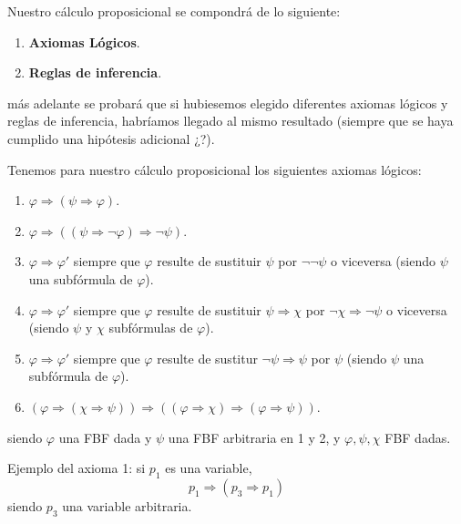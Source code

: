 \documentclass[12pt]{report}
\theoremstyle{largebreak}
\begin{document}
    Nuestro cálculo proposicional se compondrá de lo siguiente:
    \begin{enumerate}
        \item \textbf{Axiomas Lógicos}.
        \item \textbf{Reglas de inferencia}.
    \end{enumerate}
    más adelante se probará que si hubiesemos elegido diferentes axiomas lógicos y reglas de inferencia, habríamos llegado al mismo resultado (siempre que se haya cumplido una hipótesis adicional ¿?). 

    \begin{mydef}
        Tenemos para nuestro cálculo proposicional los siguientes axiomas lógicos:
        \begin{enumerate}
            \item $\varphi\Rightarrow(\psi\Rightarrow\varphi)$.
            \item $\varphi\Rightarrow((\psi\Rightarrow\neg\varphi)\Rightarrow\neg\psi)$.
            \item $\varphi\Rightarrow\varphi'$ siempre que $\varphi$ resulte de sustituir $\psi$ por $\neg\neg\psi$ o viceversa (siendo $\psi$ una subfórmula de $\varphi$).
            \item $\varphi\Rightarrow\varphi'$ siempre que $\varphi$ resulte de sustituir $\psi\Rightarrow\chi$ por $\neg\chi\Rightarrow\neg\psi$ o viceversa (siendo $\psi$ y $\chi$ subfórmulas de $\varphi$).
            \item $\varphi\Rightarrow\varphi'$ siempre que $\varphi$ resulte de sustitur $\neg\psi\Rightarrow\psi$ por $\psi$ (siendo $\psi$ una subfórmula de $\varphi$).
            \item $(\varphi\Rightarrow(\chi\Rightarrow\psi))\Rightarrow((\varphi\Rightarrow\chi)\Rightarrow(\varphi\Rightarrow\psi))$.
        \end{enumerate}
        siendo $\varphi$ una FBF dada y $\psi$ una FBF arbitraria en 1 y 2, y $\varphi,\psi,\chi$ FBF dadas.
    \end{mydef}

    \begin{exa}
        Ejemplo del axioma 1: si $p_1$ es una variable,
        \begin{equation*}
            p_1\Rightarrow(p_3\Rightarrow p_1)
        \end{equation*}
        siendo $p_3$ una variable arbitraria.
    \end{exa}
\end{document}
